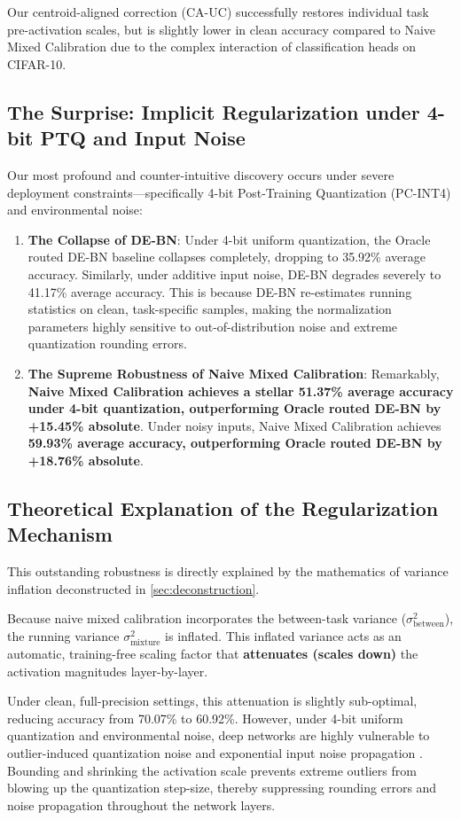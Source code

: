 \documentclass{article}
\theoremstyle{plain}
\theoremstyle{definition}
\theoremstyle{remark}
\begin{document}
Our centroid-aligned correction (CA-UC) successfully restores individual task pre-activation scales, but is slightly lower in clean accuracy compared to Naive Mixed Calibration due to the complex interaction of classification heads on CIFAR-10.

\subsection{The Surprise: Implicit Regularization under 4-bit PTQ and Input Noise}
Our most profound and counter-intuitive discovery occurs under severe deployment constraints---specifically 4-bit Post-Training Quantization (PC-INT4) and environmental noise:
\begin{enumerate}
    \item \textbf{The Collapse of DE-BN}: Under 4-bit uniform quantization, the Oracle routed DE-BN baseline collapses completely, dropping to 35.92\% average accuracy. Similarly, under additive input noise, DE-BN degrades severely to 41.17\% average accuracy. This is because DE-BN re-estimates running statistics on clean, task-specific samples, making the normalization parameters highly sensitive to out-of-distribution noise and extreme quantization rounding errors.
    \item \textbf{The Supreme Robustness of Naive Mixed Calibration}: Remarkably, \textbf{Naive Mixed Calibration achieves a stellar 51.37\% average accuracy under 4-bit quantization, outperforming Oracle routed DE-BN by +15.45\% absolute}. Under noisy inputs, Naive Mixed Calibration achieves \textbf{59.93\% average accuracy, outperforming Oracle routed DE-BN by +18.76\% absolute}.
\end{enumerate}

\subsection{Theoretical Explanation of the Regularization Mechanism}
This outstanding robustness is directly explained by the mathematics of variance inflation deconstructed in \cref{sec:deconstruction}. 

Because naive mixed calibration incorporates the between-task variance ($\sigma^2_{\text{between}}$), the running variance $\sigma^2_{\text{mixture}}$ is inflated. This inflated variance acts as an automatic, training-free scaling factor that \textbf{attenuates (scales down)} the activation magnitudes layer-by-layer. 

Under clean, full-precision settings, this attenuation is slightly sub-optimal, reducing accuracy from 70.07\% to 60.92\%. However, under 4-bit uniform quantization and environmental noise, deep networks are highly vulnerable to outlier-induced quantization noise and exponential input noise propagation \cite{Anonymous2026Qcot}. Bounding and shrinking the activation scale prevents extreme outliers from blowing up the quantization step-size, thereby suppressing rounding errors and noise propagation throughout the network layers.
\end{document}
